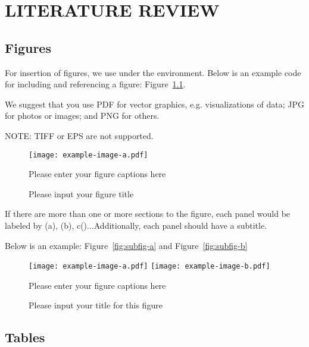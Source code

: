
\chapter{LITERATURE REVIEW}

\cite{hu_virtual_2021}
\cite{ahmad_software_2021}
\cite{alam_augmented_2017}
\cite{ankireddy_augmented_2019}
\cite{carneiro_bim_2018}
\cite{chakareski_uav-iot_2019}

\section{Figures}

For insertion of figures, we use  under the  environment. Below is an example code for including and referencing a figure: Figure~\ref{fig:example}.

We suggest that you use PDF for vector graphics, e.g. visualizations of data; JPG for photos or images; and PNG for others.

NOTE: TIFF or EPS are not supported.

\begin{figure}
  \centering
  \texttt{[image: example-image-a.pdf]}
  \caption{Please input your figure title}
  {Please enter your figure captions here}
  \label{fig:example}
\end{figure}

If there are more than one or more sections to the figure, each panel would be labeled by (a), (b), c()...Additionally, each panel should have a subtitle.

Below is an example: Figure~\ref{fig:subfig-a} and Figure~\ref{fig:subfig-b}


\begin{figure}
  \centering
    {\texttt{[image: example-image-a.pdf]}}
    {\texttt{[image: example-image-b.pdf]}}
  \caption{Please input your title for this figure}
  {Please enter your figure captions here}
  \label{fig:multi-image}
\end{figure}



\section{Tables}

